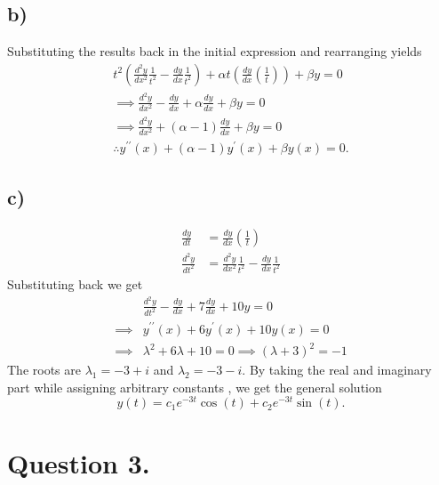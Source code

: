 \documentclass[
	12pt,
	]{article}
\newcommand{\p}{\prime}
\theoremstyle{definition}
\theoremstyle{definition}
\theoremstyle{definition}
\theoremstyle{definition}
\theoremstyle{definition}
\theoremstyle{example}
\theoremstyle{note}
\theoremstyle{remark}
\theoremstyle{example}
\begin{document}
			 \subsection*{b) }
			 Substituting the results back in the initial expression and rearranging yields 
			 \begin{gather*}
			 	t^{2} \left(\frac{d^{2}y}{dx^{2}} \frac{1}{t^{2}} - \frac{dy}{dx}\frac{1}{t^{2}}\right) + \alpha t\left(\frac{dy}{dx}\left(\frac{1}{t}\right)\right) + \beta y =0\\
			 	\implies \frac{d^{2}y}{dx^{2}} - \frac{dy}{dx} + \alpha \frac{dy}{dx} + \beta y =0 \\
			 	\implies \frac{d^{2}y}{dx^{2}} + (\alpha-1)\frac{dy}{dx} + \beta y =0 \\
			 	\therefore y^{\p \p}(x) + (\alpha -1 )y^{\p}(x) + \beta y(x) =0.
			 \end{gather*}
			 \subsection*{c) }
			 	\begin{align*}
			 		\frac{dy}{dt} &= \frac{dy}{dx}\left(\frac{1}{t}\right) \\
			 		\frac{d^{2}y}{dt^{2}} &= \frac{d^{2}y}{dx^{2}} \frac{1}{t^{2}} - \frac{dy}{dx}\frac{1}{t^{2}}
			 	\end{align*}
			 	Substituting back we get 
			 	\begin{align*}
			 		&\frac{d^{2}y}{dt^{2}} - \frac{dy}{dx} + 7 \frac{dy}{dx} + 10y =0 \\
			 		\implies & y^{\p\p}(x) + 6y^{\p}(x) + 10y(x) =0 \\
			 		\implies & \lambda^{2} + 6\lambda + 10 =0 \implies (\lambda + 3)^{2} = -1
			 	\end{align*}
			 	The roots are $\lambda_{1} = -3 + i $ and $\lambda_{2} = -3 - i$.
			 	By taking the real and imaginary part while assigning arbitrary constants , we get the general solution 
			 	$$ y(t) = c_{1} e^{-3t}\cos(t) + c_{2}e^{-3t}\sin(t).$$
			 \section*{Question 3.} 
\end{document}

